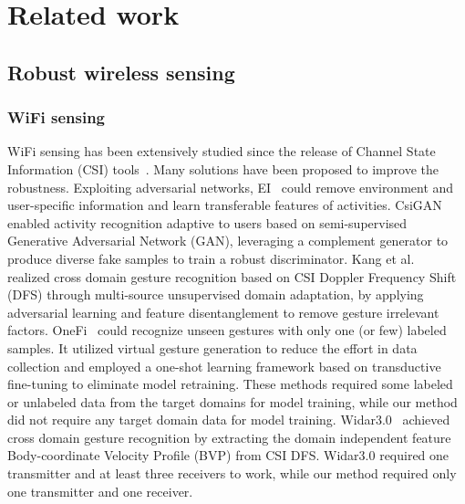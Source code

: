\documentclass[journal]{IEEEtran}
\begin{document}
\section{Related work}
\label{SecRelatedWork}

\subsection{Robust wireless sensing}
\subsubsection{WiFi sensing}
WiFi sensing has been extensively studied since the release of Channel State Information (CSI) tools~\cite{Halperin:2010,XieY:2015}. Many solutions have been proposed to improve the robustness. 
Exploiting adversarial networks, EI~\cite{JiangWJ:2018} could remove environment and user-specific information and learn transferable features of activities. 
CsiGAN~\cite{XiaoCJ:2019} enabled activity recognition adaptive to users based on semi-supervised Generative Adversarial Network (GAN), leveraging a complement generator to produce diverse fake samples to train a robust discriminator.
Kang et al.~\cite{KangH:2021} realized cross domain gesture recognition based on CSI Doppler Frequency Shift (DFS) through multi-source unsupervised domain adaptation, by applying adversarial learning and feature disentanglement to remove gesture irrelevant factors. 
OneFi~\cite{XiaoR:2021} could recognize unseen gestures with only one (or few) labeled samples. It utilized virtual gesture generation to reduce the effort in data collection and employed a one-shot learning framework based on transductive fine-tuning to eliminate model retraining. 
These methods required some labeled or unlabeled data from the target domains for model training, while our method did not require any target domain data for model training.
Widar3.0~\cite{ZhangY:2022} achieved cross domain gesture recognition by extracting the domain independent feature Body-coordinate Velocity Profile (BVP) from CSI DFS. Widar3.0 required one transmitter and at least three receivers to work, while our method required only one transmitter and one receiver.  
\end{document}
